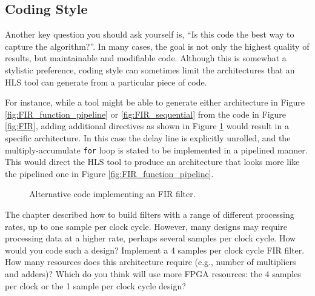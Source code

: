 %

\subsection{Coding Style}

Another key question you should ask yourself is, ``Is this code the best way to capture the algorithm?''.  In many cases, the goal is not only the highest quality of results, but maintainable and modifiable code.  Although this is somewhat a stylistic preference, coding style can sometimes limit the architectures that an HLS tool can generate from a particular piece of code.

For instance, while a tool might be able to generate either architecture in Figure \ref{fig:FIR_function_pipeline} or \ref{fig:FIR_sequential} from the code in Figure \ref{fig:FIR}, adding additional directives as shown in Figure \ref{fig:block_FIR} would result in a specific architecture. In this case the delay line is explicitly unrolled, and the multiply-accumulate \lstinline|for| loop is stated to be implemented in a pipelined manner. This would direct the HLS tool to produce an architecture that looks more like the pipelined one in Figure \ref{fig:FIR_function_pipeline}.

\begin{figure}

\caption{Alternative code implementing an FIR filter.}\label{fig:block_FIR}
\end{figure}




\begin{exercise}
The chapter described how to build filters with a range of different processing rates, up to one sample per clock cycle.  However, many designs may require processing data at a higher rate, perhaps several samples per clock cycle.  How would you code such a design?  Implement a 4 samples per clock cycle FIR filter.  How many resources does this architecture require (e.g., number of multipliers and adders)? Which do you think will use more FPGA resources: the 4 samples per clock or the 1 sample per clock cycle design?  
\end{exercise}

